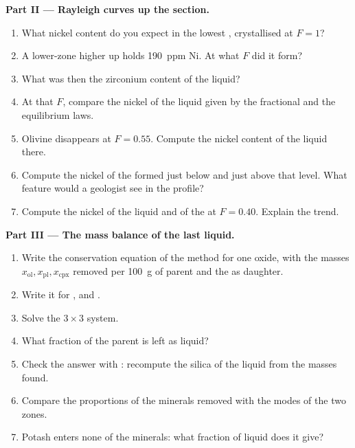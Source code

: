 \begin{problem}
\noindent\textbf{Part II --- Rayleigh curves up the section.}
\begin{enumerate}[resume]
\item What nickel content do you expect in the lowest , crystallised at
$F = 1$?
\item A lower-zone  higher up holds \qty{190}{ppm} Ni. At what $F$ did it
form?
\item What was then the zirconium content of the liquid?
\item At that $F$, compare the nickel of the liquid given by the fractional and the
equilibrium laws.
\item Olivine disappears at $F = 0.55$. Compute the nickel content of the liquid
there.
\item Compute the nickel of the  formed just below and just above that
level. What feature would a geologist see in the profile?
\item Compute the nickel of the liquid and of the  at $F = 0.40$. Explain
the trend.
\end{enumerate}

\noindent\textbf{Part III --- The mass balance of the last liquid.}
\begin{enumerate}[resume]
\item Write the conservation equation of the method for one oxide, with the masses
$x_{\mathrm{ol}}, x_{\mathrm{pl}}, x_{\mathrm{cpx}}$ removed per \qty{100}{g} of
parent and the  as daughter.
\item Write it for ,  and .
\item Solve the $3 \times 3$ system.
\item What fraction of the parent is left as liquid?
\item Check the answer with : recompute the silica of the liquid from the
masses found.
\item Compare the proportions of the minerals removed with the modes of the two
zones.
\item Potash enters none of the minerals: what fraction of liquid does it give?
\end{enumerate}


\end{problem}
